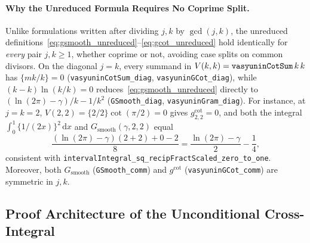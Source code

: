\documentclass[11pt,a4paper]{article}
\theoremstyle{definition}
\newcommand{\dee}{\mathrm{d}}
\begin{document}
\paragraph{Why the Unreduced Formula Requires No Coprime Split.}
Unlike formulations written after dividing $j, k$ by $\gcd(j, k)$, the unreduced definitions~\eqref{eq:gsmooth_unreduced}--\eqref{eq:gcot_unreduced} hold identically for \emph{every} pair $j, k \ge 1$, whether coprime or not, avoiding case splits on common divisors. On the diagonal $j = k$, every summand in $V(k, k) = \text{\texttt{vasyuninCotSum}}\, k\, k$ has $\{mk/k\} = 0$ (\texttt{vasyuninCotSum\_diag}, \texttt{vasyuninGCot\_diag}), while $(k - k)\ln(k/k) = 0$ reduces~\eqref{eq:gsmooth_unreduced} directly to $(\ln(2\pi) - \gamma)/k - 1/k^2$ (\texttt{GSmooth\_diag}, \texttt{vasyuninGram\_diag}). For instance, at $j = k = 2$, $V(2, 2) = \{2/2\}\cot(\pi/2) = 0$ gives $g_{2,2}^{\mathrm{cot}} = 0$, and both the integral $\int_0^1 \{1/(2x)\}^2\,\dee x$ and $G_{\mathrm{smooth}}(\gamma, 2, 2)$ equal
\begin{equation}
\frac{(\ln(2\pi) - \gamma)(2 + 2) + 0 - 2}{8} = \frac{\ln(2\pi) - \gamma}{2} - \frac{1}{4},
\end{equation}
consistent with \texttt{intervalIntegral\_\allowbreak sq\_\allowbreak recipFractScaled\_\allowbreak zero\_\allowbreak to\_\allowbreak one}. Moreover, both $G_{\mathrm{smooth}}$ (\texttt{GSmooth\_comm}) and $g^{\mathrm{cot}}$ (\texttt{vasyuninGCot\_comm}) are symmetric in $j, k$.

\subsection{Proof Architecture of the Unconditional Cross-Integral}
\end{document}
